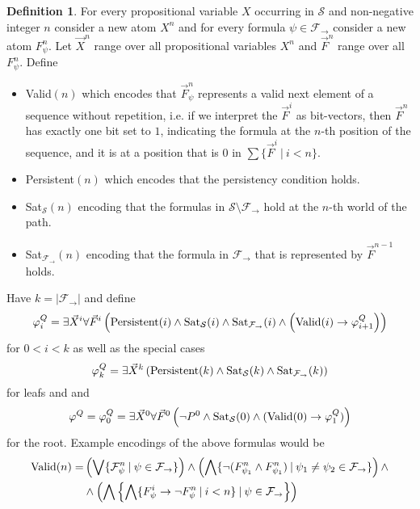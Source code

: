 \documentclass[a4paper,12pt]{report}
\theoremstyle{definition}
\theoremstyle{definition}
\theoremstyle{definition}
\theoremstyle{definition}
\theoremstyle{definition}
\newtheorem{definition}[theorem]{Definition}
\theoremstyle{definition}
\theoremstyle{definition}
\begin{document}
	\begin{definition}
		For every propositional variable $X$ occurring in $\mathcal S$ and non-negative integer $n$ consider a new atom $X^n$ and for every formula $\psi\in\mathcal F_\to$ consider a new atom $F_\psi^n$. Let $\vec X^n$ range over all propositional variables $X^n$ and $\vec F^n$ range over all $F_\psi^n$. Define
		\begin{itemize}
			\item {\normalfont Valid}$(n)$ which encodes that $\vec F^n_\psi$ represents a valid next element of a sequence without repetition, i.e. if we interpret the $\vec F^i$ as bit-vectors, then $\vec F^n$ has exactly one bit set to $1$, indicating the formula at the $n$-th position of the sequence, and it is at a position that is $0$ in $\sum\{\vec F^i\:|\:i < n\}$.
			\item {\normalfont Persistent}$(n)$ which encodes that the persistency condition holds.
			\item {\normalfont Sat}$_{\mathcal S}(n)$ encoding that the formulas in $\mathcal S\setminus\mathcal F_\to$ hold at the $n$-th world of the path.
			\item {\normalfont Sat}$_{\mathcal F_\to}(n)$ encoding that the formula in $\mathcal F_\to$ that is represented by $\vec F^{n-1}$ holds.
		\end{itemize}
		Have $k = |\mathcal F_\to|$ and define$$\varphi^Q_{i} = \exists \vec X^i\forall \vec F^i\left(\text{\normalfont Persistent}(i)\wedge \text{\normalfont Sat}_{\mathcal S}(i)\wedge \text{\normalfont Sat}_{\mathcal F_\to}(i)\wedge\left(\text{\normalfont Valid}(i)\to \varphi^Q_{i+1}\right)\right)$$
		for $0 < i < k$ as well as the special cases
		$$\varphi^Q_{k} = \exists \vec X^k\left(\text{\normalfont Persistent}(k)\wedge \text{\normalfont Sat}_{\mathcal S}(k)\wedge \text{\normalfont Sat}_{\mathcal F_\to}(k)\right)$$
		for leafs and
		and $$\varphi^Q = \varphi_0^Q = \exists \vec X^0\forall \vec F^0\left(\neg P^0\wedge \text{\normalfont Sat}_{\mathcal S}(0)\wedge(\text{\normalfont Valid}(0)\to \varphi_1^Q)\right)$$for the root.
		Example encodings of the above formulas would be
		\begin{align*}
			\text{\normalfont Valid}(n) = &\left(\bigvee \{\mathcal F^n_\psi\:|\:\psi\in\mathcal F_\to\}\right)\wedge\left(\bigwedge \{\neg(F^n_{\psi_1}\wedge F^n_{\psi_1})\:|\:\psi_1\neq\psi_2\in\mathcal F_\to\}\right)\wedge\\&\wedge\left(\bigwedge\left\{\bigwedge\{F^i_\psi\to\neg F^n_\psi\:|\:i < n\}\:|\:\psi\in\mathcal F_\to\right\}\right)\\

\end{align*}
\end{definition}
\end{document}
